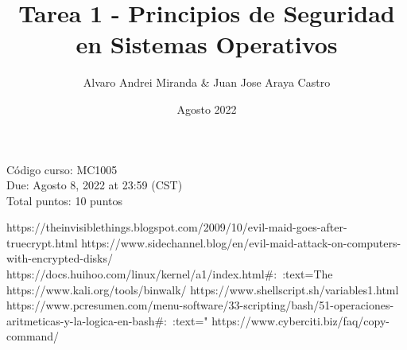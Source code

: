 \documentclass{article}
\title{Tarea 1 - Principios de Seguridad en Sistemas Operativos}
\author{Alvaro Andrei Miranda & Juan Jose Araya Castro}
\date{Agosto 2022}
\begin{document}
\maketitle

\begin{minipage}{\textwidth}
Código curso: MC1005\\
Due: Agosto 8, 2022 at 23:59 (CST)\\
Total puntos: 10 puntos\\
\end{minipage}


https://theinvisiblethings.blogspot.com/2009/10/evil-maid-goes-after-truecrypt.html
https://www.sidechannel.blog/en/evil-maid-attack-on-computers-with-encrypted-disks/
https://docs.huihoo.com/linux/kernel/a1/index.html#:~:text=The%
https://www.kali.org/tools/binwalk/
https://www.shellscript.sh/variables1.html
https://www.pcresumen.com/menu-software/33-scripting/bash/51-operaciones-aritmeticas-y-la-logica-en-bash#:~:text="%
https://www.cyberciti.biz/faq/copy-command/


    
    
\end{document}
